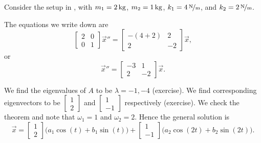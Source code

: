 \begin{example}
Consider the setup in , with
$m_1 = \unit[2]{kg}$, $m_2 = \unit[1]{kg}$, $k_1 = \unitfrac[4]{N}{m}$, and
$k_2 = \unitfrac[2]{N}{m}$.

\begin{myfig}
\capstart
{}
\caption{System of masses and springs.\label{sosa:twocartswallfig}}
\end{myfig}

The equations we write down are
\begin{equation*}
\begin{bmatrix}
2 & 0 \\
0 & 1
\end{bmatrix}
{\vec{x}}'' =
\begin{bmatrix}
-(4+2) & 2 \\
2 & -2
\end{bmatrix}
\vec{x} ,
\end{equation*}
or
\begin{equation*}
{\vec{x}}'' =
\begin{bmatrix}
-3 & 1 \\
2 & -2
\end{bmatrix}
\vec{x} .
\end{equation*}

We find the eigenvalues of $A$ to be $\lambda = -1, -4$ (exercise).
We find corresponding eigenvectors to be
$\left[ \begin{smallmatrix} 1 \\ 2 \end{smallmatrix} \right]$ and
$\left[ \begin{smallmatrix} 1 \\ -1 \end{smallmatrix} \right]$ respectively
(exercise).
We check the theorem and note that $\omega_1 = 1$ and $\omega_2 = 2$.
Hence the general solution is
\begin{equation*}
\vec{x} = 
\begin{bmatrix} 1 \\ 2 \end{bmatrix}
\bigl( a_1 \cos (t) + b_1 \sin (t) \bigr)
+
\begin{bmatrix} 1 \\ -1 \end{bmatrix}
\bigl( a_2 \cos (2t) + b_2 \sin (2t) \bigr) .
\end{equation*}


\end{example}
